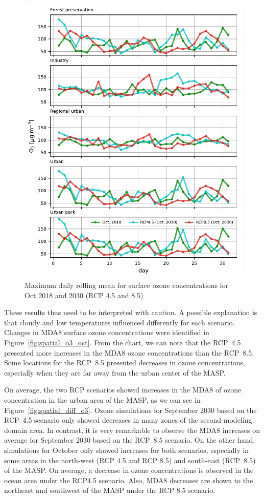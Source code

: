 \begin{figure}[!hbt]
  \begin{center}
	\includegraphics{fig/MDA8_Oct_type_rcps}
  \end{center}
  \caption{Maximum daily rolling mean for surface ozone concentrations for Oct 2018 and 2030 (RCP 4.5 and 8.5)}
  \label{fig:MDA8_rcp_oct}
\end{figure}

These results thus need to be interpreted with caution.
A possible explanation is that cloudy and low temperatures influenced differently for each scenario.
Changes in MDA8 surface ozone concentrations were identified in Figure~\ref{fig:spatial_o3_oct}. 
From the chart, we can note that the RCP~4.5 presented more increases in the MDA8 ozone concentrations than the RCP~8.5.
Some locations for the RCP~8.5 presented decreases in ozone concentrations, especially when they are far away from the urban center of the MASP.

On average, the two RCP scenarios showed increases in the MDA8 of ozone concentration in the urban area of the MASP, as we can see in Figure~\ref{fig:spatial_diff_o3}. Ozone simulations for September 2030 based on the RCP~4.5 scenario only showed decreases in many zones of the second modeling domain area. In contrast, it is very remarkable to observe the MDA8 increases on average for September 2030 based on the RCP~8.5 scenario. On the other hand, simulations for October only showed increases for both scenarios, especially in some areas in the north-west (RCP 4.5 and RCP 8.5) and south-east (RCP~8.5) of the MASP. On average, a decrease in ozone concentrations is observed in the ocean area under the RCP4.5 scenario. Also, MDA8 decreases are shown to the northeast and southwest of the MASP under the RCP 8.5 scenario.

